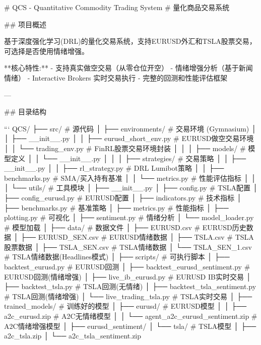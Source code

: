 # QCS - Quantitative Commodity Trading System
# 量化商品交易系统

## 项目概述

基于深度强化学习(DRL)的量化交易系统，支持EURUSD外汇和TSLA股票交易，可选择是否使用情绪增强。

**核心特性:**
- 支持真实做空交易（从零仓位开空）
- 情绪增强分析（基于新闻情绪）
- Interactive Brokers 实时交易执行
- 完整的回测和性能评估框架

---

## 目录结构

```
QCS/
├── src/                            # 源代码
│   ├── environments/               # 交易环境 (Gymnasium)
│   │   ├── __init__.py
│   │   ├── eurusd_short_env.py    # EURUSD做空交易环境
│   │   └── trading_env.py         # FinRL股票交易环境封装
│   │
│   ├── models/                    # 模型定义
│   │   └── __init__.py
│   │
│   ├── strategies/                # 交易策略
│   │   ├── __init__.py
│   │   ├── rl_strategy.py         # DRL Lumibot策略
│   │   ├── benchmarks.py           # SMA/买入持有基准
│   │   └── metrics.py             # 性能评估指标
│   │
│   └── utils/                     # 工具模块
│       ├── __init__.py
│       ├── config.py              # TSLA配置
│       ├── config_eurusd.py       # EURUSD配置
│       ├── indicators.py         # 技术指标
│       ├── benchmarks.py          # 基准策略
│       ├── metrics.py             # 性能指标
│       ├── plotting.py            # 可视化
│       ├── sentiment.py           # 情绪分析
│       └── model_loader.py         # 模型加载
│
├── data/                          # 数据文件
│   ├── EURUSD.csv                # EURUSD历史数据
│   ├── EURUSD_SEN.csv            # EURUSD情绪数据
│   ├── TSLA.csv                  # TSLA股票数据
│   ├── TSLA_SEN.csv              # TSLA情绪数据
│   └── TSLA_SEN_1.csv             # TSLA情绪数据(Headlines模式)
│
├── scripts/                        # 可执行脚本
│   ├── backtest_eurusd.py         # EURUSD回测
│   ├── backtest_eurusd_sentiment.py # EURUSD回测(情绪增强)
│   ├── live_ib_eurusd.py          # EURUSD IB实时交易
│   ├── backtest_tsla.py           # TSLA回测(无情绪)
│   ├── backtest_tsla_sentiment.py # TSLA回测(情绪增强)
│   └── live_trading_tsla.py       # TSLA实时交易
│
├── trained_models/                # 训练好的模型
│   ├── eurusd/                   # EURUSD模型
│   │   ├── a2c_eurusd.zip        # A2C无情绪模型
│   │   └── agent_a2c_eurusd_sentiment.zip # A2C情绪增强模型
│   ├── eurusd_sentiment/
│   └── tsla/                     # TSLA模型
│       ├── a2c_tsla.zip
│       └── a2c_tsla_sentiment.zip
